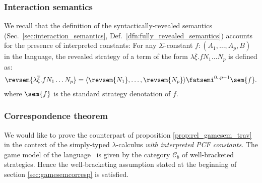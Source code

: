 \subsubsection{Interaction semantics}
We recall that the definition of the syntactically-revealed
semantics (Sec.\ \ref{sec:interaction_semantics}, Def.\
\ref{dfn:fully_revealed_semantics}) accounts for the presence of
interpreted constants: For any $\Sigma$-constant $f :
(A_1,\ldots,A_p,B)$ in the language, the revealed strategy of a term
of the form $\lambda \overline{\xi}. f N_1 \ldots N_p$ is defined
as:
$$ \revsem{\lambda \overline{\xi}. f N_1 \ldots N_p} = \langle \revsem{N_1}, \ldots, \revsem{N_p} \rangle \fatsemi^{0..p-1} \sem{f}.$$
where $\sem{f}$ is the standard strategy denotation of $f$.

\subsubsection{Correspondence theorem}
We would like to prove the counterpart of proposition
\ref{prop:rel_gamesem_trav} in the context of the simply-typed
$\lambda$-calculus \emph{with interpreted PCF constants}. The game
model of the language \pcf\ is given by the category $\mathcal{C}_b$
of well-bracketed strategies. Hence the well-bracketing assumption
stated at the beginning of section \ref{sec:gamesemcorresp} is
satisfied.

